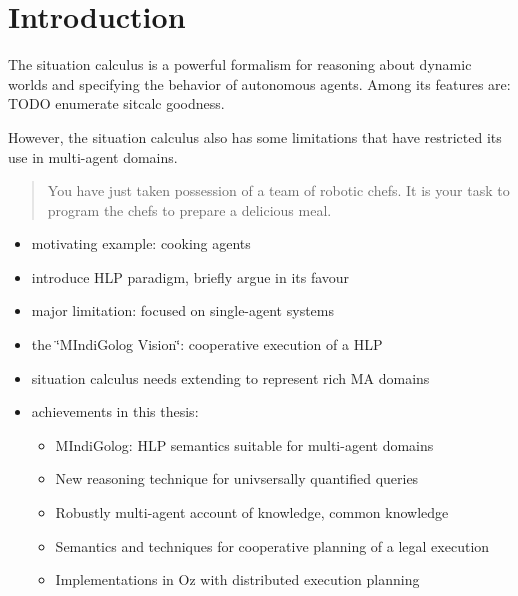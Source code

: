 

\chapter{Introduction}

The situation calculus is a powerful formalism for reasoning about
dynamic worlds and specifying the behavior of autonomous agents. Among
its features are: TODO enumerate sitcalc goodness.

However, the situation calculus also has some limitations that have
restricted its use in multi-agent domains.

\begin{quote}
You have just taken possession of a team of robotic chefs. It is your
task to program the chefs to prepare a delicious meal. 
\end{quote}
\begin{itemize}
\item motivating example: cooking agents 
\item introduce HLP paradigm, briefly argue in its favour 
\item major limitation: focused on single-agent systems 
\item the \char`\"{}MIndiGolog Vision\char`\"{}: cooperative execution of
a HLP 
\item situation calculus needs extending to represent rich MA domains 
\item achievements in this thesis:

\begin{itemize}
\item MIndiGolog: HLP semantics suitable for multi-agent domains 
\item New reasoning technique for univsersally quantified queries 
\item Robustly multi-agent account of knowledge, common knowledge 
\item Semantics and techniques for cooperative planning of a legal execution 
\item Implementations in Oz with distributed execution planning 
\end{itemize}
\end{itemize}
